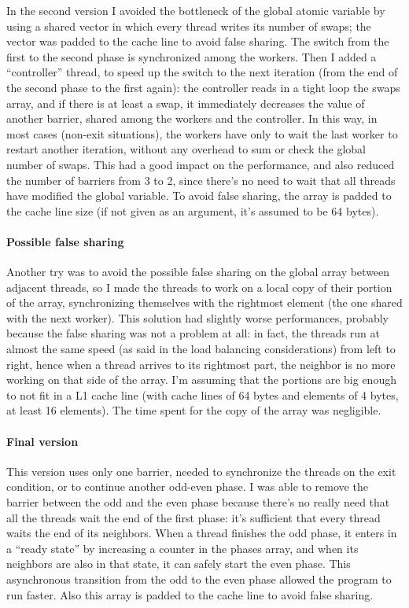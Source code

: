 In the second version I avoided the bottleneck of the global atomic variable by using a shared vector in which every thread writes its number of swaps; the vector was padded to the cache line to avoid false sharing. The switch from the first to the second phase is synchronized among the workers. Then I added a ``controller'' thread, to speed up the switch to the next iteration (from the end of the second phase to the first again): the controller reads in a tight loop the swaps array, and if there is at least a swap, it immediately decreases the value of another barrier, shared among the workers and the controller. In this way, in most cases (non-exit situations), the workers have only to wait the last worker to restart another iteration, without any overhead to sum or check the global number of swaps. This had a good impact on the performance, and also reduced the number of barriers from 3 to 2, since there's no need to wait that all threads have modified the global variable. To avoid false sharing, the array is padded to the cache line size (if not given as an argument, it's assumed to be 64 bytes).

\paragraph{Possible false sharing}
Another try was to avoid the possible false sharing on the global array between adjacent threads, so I made the threads to work on a local copy of their portion of the array, synchronizing themselves with the rightmost element (the one shared with the next worker). This solution had slightly worse performances, probably because the false sharing was not a problem at all: in fact, the threads run at almost the same speed (as said in the load balancing considerations) from left to right, hence when a thread arrives to its rightmost part, the neighbor is no more working on that side of the array. I'm assuming that the portions are big enough to not fit in a L1 cache line (with cache lines of 64 bytes and elements of 4 bytes, at least 16 elements). The time spent for the copy of the array was negligible.

\paragraph{Final version}
This version uses only one barrier, needed to synchronize the threads on the exit condition, or to continue another odd-even phase. I was able to remove the barrier between the odd and the even phase because there's no really need that all the threads wait the end of the first phase: it's sufficient that every thread waits the end of its neighbors. When a thread finishes the odd phase, it enters in a ``ready state'' by increasing a counter in the phases array, and when its neighbors are also in that state, it can safely start the even phase. This asynchronous transition from the odd to the even phase allowed the program to run faster. Also this array is padded to the cache line to avoid false sharing.

